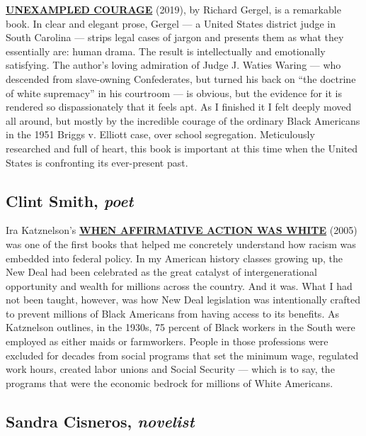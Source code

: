 \textbf{\href{https://www.nytimes.com/2019/02/07/books/review/richard-gergel-unexampled-courage.html}{UNEXAMPLED
COURAGE}} (2019), by Richard Gergel, is a remarkable book. In clear and
elegant prose, Gergel --- a United States district judge in South
Carolina --- strips legal cases of jargon and presents them as what they
essentially are: human drama. The result is intellectually and
emotionally satisfying. The author's loving admiration of Judge J.
Waties Waring --- who descended from slave-owning Confederates, but
turned his back on ``the doctrine of white supremacy'' in his courtroom
--- is obvious, but the evidence for it is rendered so dispassionately
that it feels apt. As I finished it I felt deeply moved all around, but
mostly by the incredible courage of the ordinary Black Americans in the
1951 Briggs v. Elliott case, over school segregation. Meticulously
researched and full of heart, this book is important at this time when
the United States is confronting its ever-present past.

\hypertarget{clint-smith-poet}{%
\subsection{\texorpdfstring{Clint Smith,
\emph{poet}}{Clint Smith, poet}}\label{clint-smith-poet}}

Ira Katznelson's
\textbf{\href{https://www.nytimes.com/2005/08/28/books/review/when-affirmative-action-was-white-uncivil-rights.html}{WHEN
AFFIRMATIVE ACTION WAS WHITE}} (2005) was one of the first books that
helped me concretely understand how racism was embedded into federal
policy. In my American history classes growing up, the New Deal had been
celebrated as the great catalyst of intergenerational opportunity and
wealth for millions across the country. And it was. What I had not been
taught, however, was how New Deal legislation was intentionally crafted
to prevent millions of Black Americans from having access to its
benefits. As Katznelson outlines, in the 1930s, 75 percent of Black
workers in the South were employed as either maids or farmworkers.
People in those professions were excluded for decades from social
programs that set the minimum wage, regulated work hours, created labor
unions and Social Security --- which is to say, the programs that were
the economic bedrock for millions of White Americans.

\hypertarget{sandra-cisneros-novelist}{%
\subsection{\texorpdfstring{Sandra Cisneros,
\emph{novelist}}{Sandra Cisneros, novelist}}\label{sandra-cisneros-novelist}}

